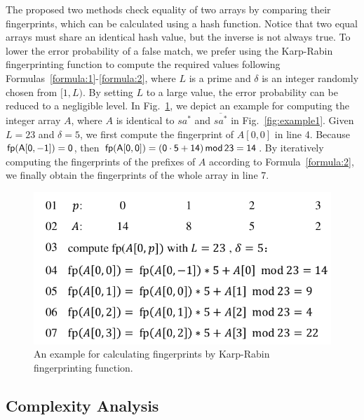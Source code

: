 \documentclass[10pt,journal,compsoc]{IEEEtran}
\begin{document}
The proposed two methods check equality of two arrays by comparing their fingerprints, which can be calculated using a hash function. Notice that two equal arrays must share an identical hash value, but the inverse is not always true. To lower the error probability of a false match, we prefer using the Karp-Rabin fingerprinting function to compute the required values following Formulas~\ref{formula:1}-\ref{formula:2}, where $L$ is a prime and $\delta$ is an integer randomly chosen from $[1, L)$. By setting $L$ to a large value, the error probability can be reduced to a negligible level. In Fig.~\ref{fig:example2}, we depict an example for computing the integer array $A$, where $A$ is identical to $sa^*$ and $\overline{sa^*}$ in Fig.~\ref{fig:example1}. Given $L = 23$ and $\delta = 5$, we first compute the fingerprint of $A[0, 0]$ in line 4. Because $\sf fp(A[0, -1]) = 0$, then $\sf fp(A[0, 0]) = (0 \cdot 5 + 14) \, mod \, 23 = 14$. By iteratively computing the fingerprints of the prefixes of $A$ according to Formula~\ref{formula:2}, we finally obtain the fingerprints of the whole array in line 7.

\begin{figure}[htbp!]
	\centering
	
	\includegraphics[width = 1\columnwidth]{example2.pdf}
	
	\caption{An example for calculating fingerprints by Karp-Rabin fingerprinting function.}
	
	\label{fig:example2}
	
\end{figure}

\subsection{Complexity Analysis}
\end{document}
